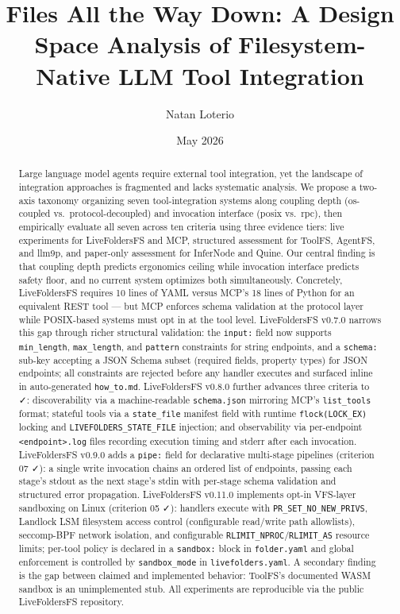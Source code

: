 \documentclass[
  11pt,
]{article}
\title{Files All the Way Down: A Design Space Analysis of
Filesystem-Native LLM Tool Integration}
\author{Natan Loterio}
\date{May 2026}
\begin{document}
\maketitle
\begin{abstract}
Large language model agents require external tool integration, yet the
landscape of integration approaches is fragmented and lacks systematic
analysis. We propose a two-axis taxonomy organizing seven
tool-integration systems along coupling depth (os-coupled
vs.~protocol-decoupled) and invocation interface (posix vs.~rpc), then
empirically evaluate all seven across ten criteria using three evidence
tiers: live experiments for LiveFoldersFS and MCP, structured assessment
for ToolFS, AgentFS, and llm9p, and paper-only assessment for InferNode
and Quine. Our central finding is that coupling depth predicts
ergonomics ceiling while invocation interface predicts safety floor, and
no current system optimizes both simultaneously. Concretely,
LiveFoldersFS requires 10 lines of YAML versus MCP's 18 lines of Python
for an equivalent REST tool --- but MCP enforces schema validation at
the protocol layer while POSIX-based systems must opt in at the tool
level. LiveFoldersFS v0.7.0 narrows this gap through richer structural
validation: the \texttt{input:} field now supports \texttt{min\_length},
\texttt{max\_length}, and \texttt{pattern} constraints for string
endpoints, and a \texttt{schema:} sub-key accepting a JSON Schema subset
(required fields, property types) for JSON endpoints; all constraints
are rejected before any handler executes and surfaced inline in
auto-generated \texttt{how\_to.md}. LiveFoldersFS v0.8.0 further
advances three criteria to ✓: discoverability via a machine-readable
\texttt{schema.json} mirroring MCP's \texttt{list\_tools} format;
stateful tools via a \texttt{state\_file} manifest field with runtime
\texttt{flock(LOCK\_EX)} locking and \texttt{LIVEFOLDERS\_STATE\_FILE}
injection; and observability via per-endpoint
\texttt{\textless{}endpoint\textgreater{}.log} files recording execution
timing and stderr after each invocation. LiveFoldersFS v0.9.0 adds a
\texttt{pipe:} field for declarative multi-stage pipelines (criterion 07
✓): a single write invocation chains an ordered list of endpoints,
passing each stage's stdout as the next stage's stdin with per-stage
schema validation and structured error propagation. LiveFoldersFS
v0.11.0 implements opt-in VFS-layer sandboxing on Linux (criterion 05
✓): handlers execute with \texttt{PR\_SET\_NO\_NEW\_PRIVS}, Landlock LSM
filesystem access control (configurable read/write path allowlists),
seccomp-BPF network isolation, and configurable
\texttt{RLIMIT\_NPROC}/\texttt{RLIMIT\_AS} resource limits; per-tool
policy is declared in a \texttt{sandbox:} block in \texttt{folder.yaml}
and global enforcement is controlled by \texttt{sandbox\_mode} in
\texttt{livefolders.yaml}. A secondary finding is the gap between
claimed and implemented behavior: ToolFS's documented WASM sandbox is an
unimplemented stub. All experiments are reproducible via the public
LiveFoldersFS repository.
\end{abstract}
\end{document}
